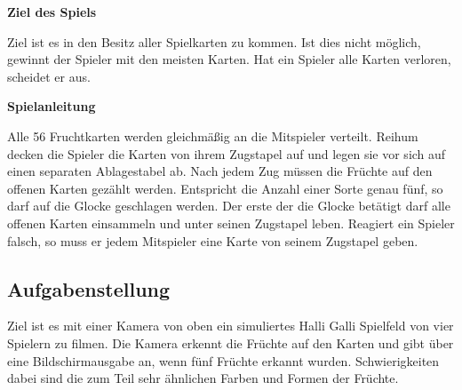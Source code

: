 \textbf{Ziel des Spiels}

Ziel ist es in den Besitz aller Spielkarten zu kommen. Ist dies nicht möglich, gewinnt der Spieler mit den meisten Karten. Hat ein Spieler alle Karten verloren, scheidet er aus. 

\textbf{Spielanleitung}

Alle 56 Fruchtkarten werden gleichmäßig an die Mitspieler verteilt. Reihum decken die Spieler die Karten von ihrem Zugstapel auf und legen sie vor sich auf einen separaten Ablagestabel ab. Nach jedem Zug müssen die Früchte auf den offenen Karten gezählt werden. Entspricht die Anzahl einer Sorte genau fünf, so darf auf die Glocke geschlagen werden. Der erste der die Glocke betätigt darf alle offenen Karten einsammeln und unter seinen Zugstapel leben. Reagiert ein Spieler falsch, so muss er jedem Mitspieler eine Karte von seinem Zugstapel geben. 

\subsection{Aufgabenstellung}

Ziel ist es mit einer Kamera von oben ein simuliertes Halli Galli Spielfeld von vier Spielern zu filmen. Die Kamera erkennt die Früchte auf den Karten und gibt über eine Bildschirmausgabe an, wenn fünf Früchte erkannt wurden. Schwierigkeiten dabei sind die zum Teil  sehr ähnlichen Farben und Formen der Früchte. \\


